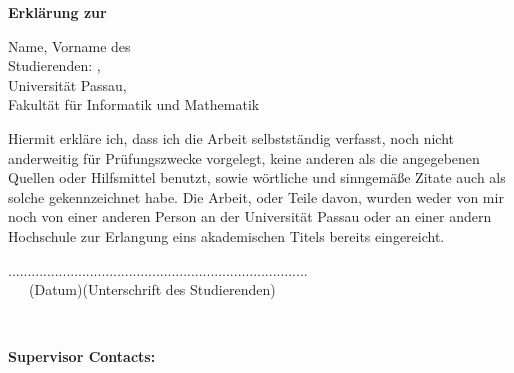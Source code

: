 
\thispagestyle{empty}

\begin{center}
\huge{\textbf{Erklärung zur \thesistype}}
\end{center}

\vspace{4cm}
Name, Vorname des\\Studierenden: \hspace{4cm} \authornamelast,~\authornamefirst~\authornamemiddle
\vspace{2cm}
\\Universität Passau,\\
Fakultät für Informatik und Mathematik
\vspace{3cm}
\begin{center}
Hiermit erkläre ich, dass ich die Arbeit selbstständig verfasst, noch nicht anderweitig
für Prüfungszwecke vorgelegt, keine anderen als die angegebenen Quellen oder Hilfsmittel
benutzt, sowie wörtliche und sinngemäße Zitate auch als solche gekennzeichnet habe. Die Arbeit, 
oder Teile davon, wurden weder von mir noch von einer anderen Person an der Universität Passau 
oder an einer andern Hochschule zur Erlangung eins akademischen Titels bereits eingereicht.

\end{center}
\vspace{4.5cm}
.........................\hfill....................................................\\
~~~(Datum)\hfill(Unterschrift des Studierenden)

\cleardoublepage
~
\vfill


{\bf{Supervisor Contacts:}} \smallskip \\
\contactprofone\\
\contactsupervisor\\

\cleardoublepage